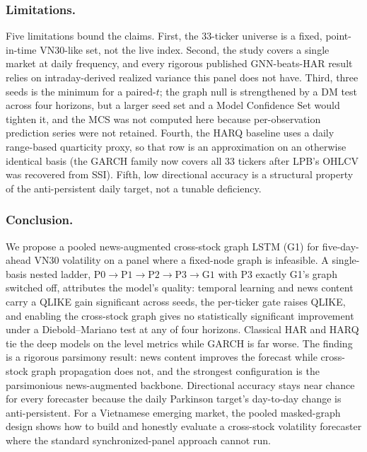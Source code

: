 \documentclass[runningheads]{llncs}
\newcommand{\ntick}{33}
\begin{document}
\subsubsection{Limitations.}
Five limitations bound the claims. First, the \ntick-ticker universe is a fixed, point-in-time VN30-like
set, not the live index. Second, the study covers a single market at daily frequency, and every rigorous
published GNN-beats-HAR result relies on intraday-derived realized variance this panel does not have.
Third, three seeds is the minimum for a paired-$t$; the graph null is strengthened by a DM test across four
horizons, but a larger seed set and a Model Confidence Set would tighten it, and the MCS was not computed
here because per-observation prediction series were not retained. Fourth, the HARQ baseline uses a daily
range-based quarticity proxy, so that row is an approximation on an otherwise identical basis (the GARCH
family now covers all \ntick{} tickers after LPB's OHLCV was recovered from SSI). Fifth, low directional
accuracy is a structural property of the
anti-persistent daily target, not a tunable deficiency.

\subsubsection{Conclusion.}
We propose a pooled news-augmented cross-stock graph LSTM (G1) for five-day-ahead VN30 volatility on a
panel where a fixed-node graph is infeasible. A single-basis nested ladder, $\text{P0}\to\text{P1}\to
\text{P2}\to\text{P3}\to\text{G1}$ with P3 exactly G1's graph switched off, attributes the model's quality:
temporal learning and news content carry a QLIKE gain significant across seeds, the per-ticker gate raises
QLIKE, and enabling the cross-stock graph gives no statistically significant improvement under a
Diebold--Mariano test at any of four horizons. Classical HAR and HARQ tie the deep models on the level
metrics while GARCH is far worse. The finding is a rigorous parsimony result: news content improves the
forecast while cross-stock graph propagation does not, and the strongest configuration is the parsimonious
news-augmented backbone. Directional accuracy stays near chance for every forecaster because the daily
Parkinson target's day-to-day change is anti-persistent. For a Vietnamese emerging market, the pooled
masked-graph design shows how to build and honestly evaluate a cross-stock volatility forecaster where the
standard synchronized-panel approach cannot run.
\end{document}
